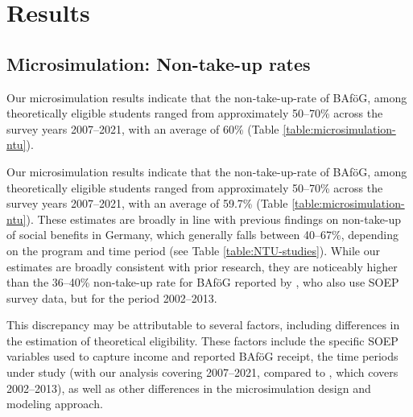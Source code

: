 %
%



\section{Results}
\subsection{Microsimulation: Non-take-up rates}
Our microsimulation results indicate that the non-take-up-rate of BAföG, among theoretically eligible students ranged from approximately 50--70\% across the survey years 2007--2021, with an average of 60\%  (Table \ref{table:microsimulation-ntu}). 


Our microsimulation results indicate that the non-take-up-rate of BAföG, among theoretically eligible students ranged from approximately 50--70\% across the survey years 2007--2021, with an average of 59.7\%  (Table \ref{table:microsimulation-ntu}). These estimates are broadly in line with previous findings on non-take-up of social benefits in Germany, which generally falls between 40--67\%, depending on the program and time period (see Table \ref{table:NTU-studies}). 
While our estimates are broadly consistent with prior research, they are noticeably higher than the 36--40\% non-take-up rate for BAföG reported by \cite{herber_non-take-up_2019}, who also use SOEP survey data, but for the period 2002--2013.




This discrepancy may be attributable to several factors, including differences in the estimation of theoretical eligibility. These factors include the specific SOEP variables used to capture income and reported BAföG receipt, the time periods under study (with our analysis covering 2007--2021, compared to \cite{herber_non-take-up_2019}, which covers 2002--2013), as well as other differences in the microsimulation design and modeling approach.

